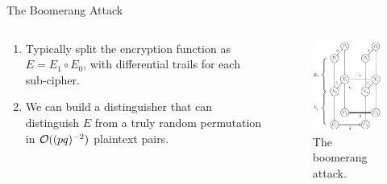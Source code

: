 \documentclass[notheorems]{beamer}
\theoremstyle{definition}
\theoremstyle{example}
\begin{document}
    \begin{frame}{The Boomerang Attack}
        \begin{columns}
            \begin{column}{0.7\textwidth}
                \begin{enumerate}
                    \item<1-> Typically split the encryption function as \(E =
                    E_1 \circ E_0\), with differential trails for each
                    sub-cipher.
                    \item<2-> We can build a distinguisher that can distinguish
                    \(E\) from a truly random permutation in
                    \(\mathcal O((pq)^{-2})\) plaintext pairs.
                \end{enumerate}
            \end{column}
            \begin{column}{0.3\textwidth}
                \begin{figure}[!ht]
                    \centering
                    \includegraphics[width=\columnwidth]{images/boomerang.png}
                    \caption{The boomerang attack.}
                    \label{fig:boomerang}
                \end{figure}
            \end{column}
        \end{columns}
    \end{frame}
\end{document}
